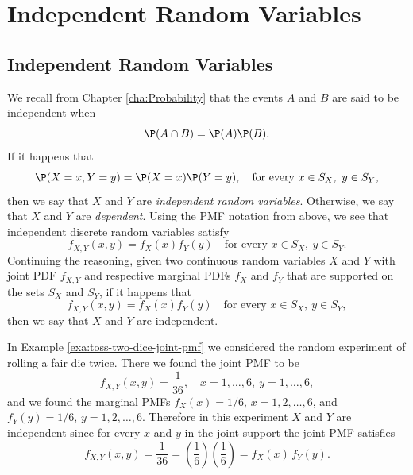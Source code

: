 \documentclass[captions=tableheading]{scrbook}
\begin{document}
\section{Independent Random Variables}
\label{sec-7-4}

\label{sec:Independent-Random-Variables}
\subsection{Independent Random Variables}
\label{sec-7-4-1}

\label{sub:Independent-Random-Variables}

We recall from Chapter \ref{cha:Probability} that the events \(A\) and \(B\) are said to be independent when
\begin{equation}
\P(A\cap B)=\P(A)\P(B).
\end{equation}
If it happens that
\begin{equation}
\P(X=x,Y=y)=\P(X=x)\P(Y=y),\quad\mbox{for every }x\in S_{X},\ y\in S_{Y},
\end{equation}
then we say that \(X\) and \(Y\) are \emph{independent random variables}. Otherwise, we say that \(X\) and \(Y\) are \emph{dependent}. Using the PMF notation from above, we see that independent discrete random variables satisfy
\begin{equation}
f_{X,Y}(x,y)=f_{X}(x)f_{Y}(y)\quad\mbox{for every }x\in S_{X},\ y\in S_{Y}.
\end{equation}
Continuing the reasoning, given two continuous random variables \(X\) and \(Y\) with joint PDF \(f_{X,Y}\) and respective marginal PDFs \(f_{X}\) and \(f_{Y}\) that are supported on the sets \(S_{X}\) and \(S_{Y}\), if it happens that
\begin{equation}
f_{X,Y}(x,y)=f_{X}(x)f_{Y}(y)\quad\mbox{for every }x\in S_{X},\ y\in S_{Y},
\end{equation}
then we say that \(X\) and \(Y\) are independent.

\begin{example}
In Example \ref{exa:toss-two-dice-joint-pmf} we considered the random experiment of rolling a fair die twice. There we found the joint PMF to be
\[
f_{X,Y}(x,y)=\frac{1}{36},\quad x=1,\ldots,6,\ y=1,\ldots,6,
\]
and we found the marginal PMFs \(f_{X}(x)=1/6\), \(x=1,2,\ldots,6\), and \(f_{Y}(y)=1/6\), \(y=1,2,\ldots,6\). Therefore in this experiment \(X\) and \(Y\) are independent since for every \(x\) and \(y\) in the joint support the joint PMF satisfies
\[
f_{X,Y}(x,y)=\frac{1}{36}=\left(\frac{1}{6}\right)\left(\frac{1}{6}\right)=f_{X}(x)\, f_{Y}(y).
\]
\end{example}
\end{document}
